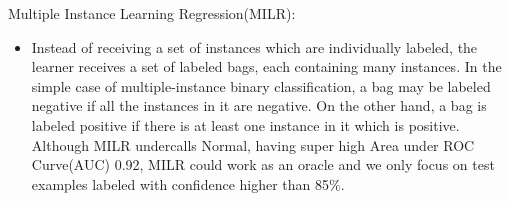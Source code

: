 Multiple Instance Learning Regression(MILR):\\
\begin{itemize}
	\item 
	Instead of receiving a set of instances which are individually labeled, the learner receives a set of labeled bags, each containing many instances. In the simple case of multiple-instance binary classification, a bag may be labeled negative if all the instances in it are negative. On the other hand, a bag is labeled positive if there is at least one instance in it which is positive. \cite{b10} Although MILR undercalls Normal, having super high Area under ROC Curve(AUC) 0.92, MILR could work as an oracle and we only focus on test examples labeled with confidence higher than 85\%.\\
\end{itemize}
